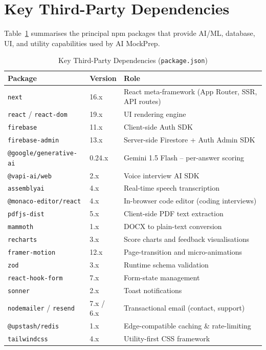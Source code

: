 \section{Key Third-Party Dependencies}
\label{app:deps}

Table~\ref{tab:deps} summarises the principal npm packages that provide
AI/ML, database, UI, and utility capabilities used by AI MockPrep.

\begin{table}[H]
\centering
\caption{Key Third-Party Dependencies (\texttt{package.json})}
\label{tab:deps}
\begin{tabular}{|p{4.8cm}|p{1.8cm}|p{6.5cm}|}
\hline
\textbf{Package} & \textbf{Version} & \textbf{Role} \\
\hline
\texttt{next}                       & 16.x   & React meta-framework (App Router, SSR, API routes) \\
\hline
\texttt{react} / \texttt{react-dom} & 19.x   & UI rendering engine \\
\hline
\texttt{firebase}                   & 11.x   & Client-side Auth SDK \\
\hline
\texttt{firebase-admin}             & 13.x   & Server-side Firestore + Auth Admin SDK \\
\hline
\texttt{@google/generative-ai}      & 0.24.x & Gemini 1.5 Flash -- per-answer scoring \\
\hline
\texttt{@vapi-ai/web}               & 2.x    & Voice interview AI SDK \\
\hline
\texttt{assemblyai}                 & 4.x    & Real-time speech transcription \\
\hline
\texttt{@monaco-editor/react}       & 4.x    & In-browser code editor (coding interviews) \\
\hline
\texttt{pdfjs-dist}                 & 5.x    & Client-side PDF text extraction \\
\hline
\texttt{mammoth}                    & 1.x    & DOCX to plain-text conversion \\
\hline
\texttt{recharts}                   & 3.x    & Score charts and feedback visualisations \\
\hline
\texttt{framer-motion}              & 12.x   & Page-transition and micro-animations \\
\hline
\texttt{zod}                        & 3.x    & Runtime schema validation \\
\hline
\texttt{react-hook-form}            & 7.x    & Form-state management \\
\hline
\texttt{sonner}                     & 2.x    & Toast notifications \\
\hline
\texttt{nodemailer} / \texttt{resend} & 7.x / 6.x & Transactional email (contact, support) \\
\hline
\texttt{@upstash/redis}             & 1.x    & Edge-compatible caching \& rate-limiting \\
\hline
\texttt{tailwindcss}                & 4.x    & Utility-first CSS framework \\
\hline
\end{tabular}
\end{table}
